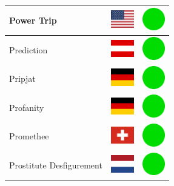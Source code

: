 \documentclass[12pt, a4paper, twoside]{report}
\begin{document}
\begin{center}
\begin{longtable}{|p{5cm}|p{2cm}|p{2cm}|}
 Power Trip                                                 & \includegraphics[width=1cm]{4x3/us} &   \includegraphics[width=1cm]{likes/y} \\ \hline
 Prediction                                                 & \includegraphics[width=1cm]{4x3/at} &   \includegraphics[width=1cm]{likes/y} \\ \hline
 Pripjat                                                    & \includegraphics[width=1cm]{4x3/de} &   \includegraphics[width=1cm]{likes/y} \\ \hline
 Profanity                                                  & \includegraphics[width=1cm]{4x3/de} &   \includegraphics[width=1cm]{likes/y} \\ \hline
 Promethee                                                  & \includegraphics[width=1cm]{4x3/ch} &   \includegraphics[width=1cm]{likes/y} \\ \hline
 Prostitute Desfigurement                                   & \includegraphics[width=1cm]{4x3/nl} &   \includegraphics[width=1cm]{likes/y} \\ \hline

\end{longtable}
\end{center}
\end{document}
